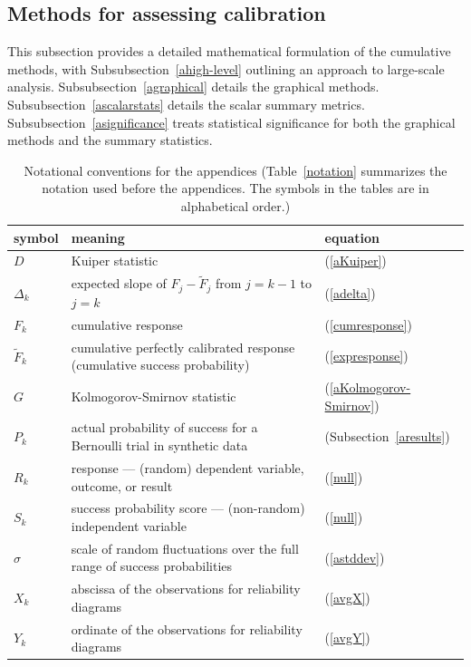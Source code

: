 \documentclass{article}
\begin{document}
\subsection{Methods for assessing calibration}
\label{amethods}

This subsection provides a detailed mathematical formulation
of the cumulative methods,
with Subsubsection~\ref{ahigh-level} outlining an approach
to large-scale analysis.
Subsubsection~\ref{agraphical} details the graphical methods.
Subsubsection~\ref{ascalarstats} details the scalar summary metrics.
Subsubsection~\ref{asignificance} treats statistical significance
for both the graphical methods and the summary statistics.


\begin{table}
\caption{Notational conventions for the appendices
(Table~\ref{notation} summarizes the notation used before the appendices.
The symbols in the tables are in alphabetical order.)}
\label{anotation}
\begin{center}
\begin{tabular}{lll}
\hline
symbol & meaning & equation \\\hline
$D$ & Kuiper statistic & (\ref{aKuiper}) \\
$\Delta_k$ & expected slope of $F_j - \tilde{F}_j$ from $j = k-1$ to $j = k$ &
(\ref{adelta}) \\
$F_k$ & cumulative response & (\ref{cumresponse}) \\
$\tilde{F}_k$ &
cumulative perfectly calibrated response (cumulative success probability) &
(\ref{expresponse}) \\
$G$ & Kolmogorov-Smirnov statistic & (\ref{aKolmogorov-Smirnov}) \\
$P_k$ & actual probability of success for a Bernoulli trial in synthetic data
& (Subsection~\ref{aresults}) \\
$R_k$ & response --- (random) dependent variable, outcome, or result &
(\ref{null}) \\
$S_k$ & success probability score --- (non-random) independent variable &
(\ref{null}) \\
$\sigma$ &
scale of random fluctuations over the full range of success probabilities &
(\ref{astddev}) \\
$X_k$ & abscissa of the observations for reliability diagrams & (\ref{avgX}) \\
$Y_k$ & ordinate of the observations for reliability diagrams & (\ref{avgY}) \\
\hline
\end{tabular}
\end{center}
\end{table}
\end{document}
